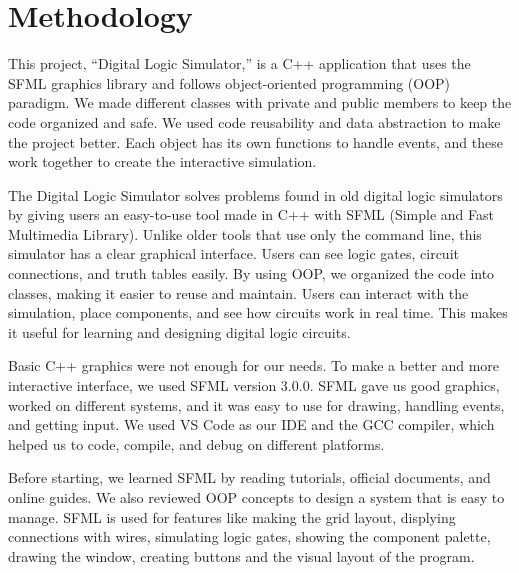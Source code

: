 \section{Methodology}

This project, “Digital Logic Simulator,” is a C++ application that uses the SFML graphics library and follows object-oriented programming (OOP) paradigm. We made different classes with private and public members to keep the code organized and safe. We used code reusability and data abstraction to make the project better. Each object has its own functions to handle events, and these work together to create the interactive simulation.

\vspace{0.5cm}
The Digital Logic Simulator solves problems found in old digital logic simulators by giving users an easy-to-use tool made in C++ with SFML (Simple and Fast Multimedia Library). Unlike older tools that use only the command line, this simulator has a clear graphical interface. Users can see logic gates, circuit connections, and truth tables easily. By using OOP, we organized the code into classes, making it easier to reuse and maintain. Users can interact with the simulation, place components, and see how circuits work in real time. This makes it useful for learning and designing digital logic circuits.

\vspace{0.5cm}
Basic C++ graphics were not enough for our needs. To make a better and more interactive interface, we used SFML version 3.0.0. SFML gave us good graphics, worked on different systems, and it was easy to use for drawing, handling events, and getting input. We used VS Code as our IDE and the GCC compiler, which helped us to code, compile, and debug on different platforms.

\vspace{0.5cm}
Before starting, we learned SFML by reading tutorials, official documents, and online guides. We also reviewed OOP concepts to design a system that is easy to manage. SFML is used for features like making the grid layout, displying connections with wires, simulating logic gates, showing the component palette, drawing the window, creating buttons and the visual layout of the program.
\clearpage